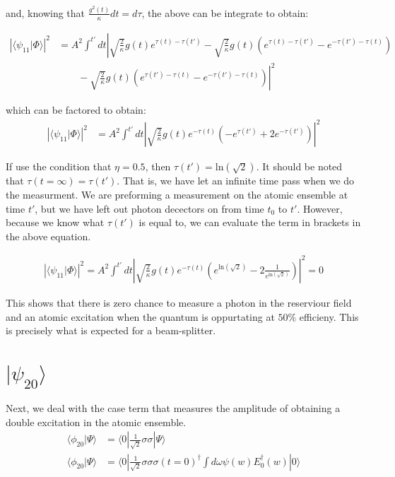 \documentclass[12pt]{article}
\begin{document}
and, knowing that $\frac{g^2(t)}{\kappa}dt = d\tau$, the above can be integrate to obtain:

\begin{align}
\left | \langle \psi_{11} | \Phi \rangle \right | ^2 &=A^2\int^{t'} dt \left| \sqrt{\frac{2}{\kappa}} g(t) e^{\tau(t)-\tau(t')} - \sqrt{\frac{2}{\kappa}} g(t)\left( e^{\tau(t)-\tau(t')} - e^{-\tau(t')-\tau(t)} \right )\right.\\
&\left. \qquad -\sqrt{\frac{2}{\kappa}} g(t) \left( e^{\tau(t')-\tau(t)} - e^{-\tau(t')-\tau(t)} \right)\right|^2 
\end{align}

which can be factored to obtain:
\begin{align}
\label{p11}
\left | \langle \psi_{11} | \Phi \rangle \right | ^2  &= A^2\int^{t'} dt \left|\sqrt{\frac{2}{\kappa}} g(t) e^{-\tau(t)} \left (- e^{\tau(t')} +2 e^{-\tau(t')} \right ) \right |^2 
\end{align}

If use the condition that $\eta=0.5$, then $\tau(t') = \textrm{ln}(\sqrt{2})$. It should be noted that $\tau(t=\infty) = \tau(t')$. That is, we have let an infinite time pass when we do the measurment. We are preforming a measurement on the atomic ensemble at time $t'$, but we have left out photon decectors on from time $t_0$ to $t'$. However, because we know what $\tau(t')$ is equal to, we can evaluate the term in brackets in the above equation.

\begin{align}
\left | \langle \psi_{11} | \Phi \rangle \right | ^2 = A^2\int^{t'} dt \left| \sqrt{\frac{2}{\kappa}} g(t) e^{-\tau(t)} \left ( e^{\textrm{ln}(\sqrt{2})} -2 \frac{1}{e^{\textrm{ln}({\sqrt{2}})}} \right ) \right|^2 = 0 
\end{align}

This shows that there is zero chance to measure a photon in the reserviour field and an atomic excitation when the quantum is oppurtating at $50\%$ efficieny. This is precisely what is expected for a beam-splitter.


\section{ $| \psi_{20} \rangle$}
Next, we deal with the case term that measures the amplitude of obtaining a double excitation in the atomic ensemble.
\begin{align}
\langle \phi_{20}| \Psi \rangle &=\langle 0 |\frac{1}{\sqrt{2}} \sigma \sigma | \Psi \rangle\\
\langle \phi_{20}| \Psi \rangle &=\langle 0 | \frac{1}{\sqrt{2}} \sigma \sigma 
\sigma(t=0)^\dagger \int d\omega \psi(w) E_0^\dagger(w) | 0 \rangle
\end{align}
\end{document}
